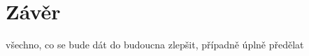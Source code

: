 \chapter{Závěr}
\label{5-zaver}

všechno, co se bude dát do budoucna zlepšit, případně úplně předělat